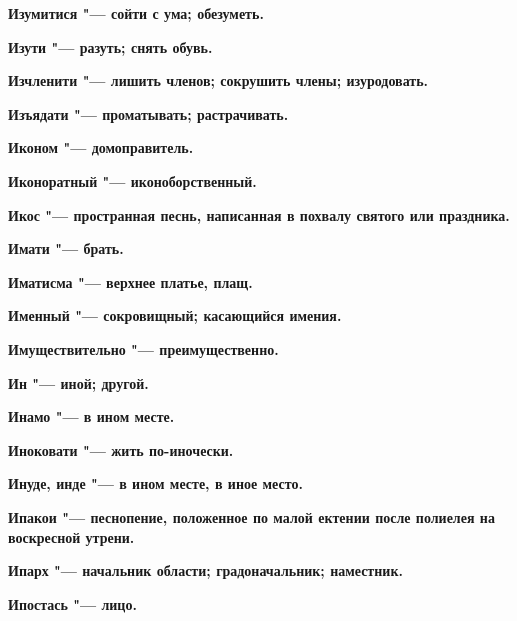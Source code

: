 \begin{mymulticols}{2}
\bfseries Изумитися\normalfont{} "--- сойти с ума; обезуметь. 




\bfseries Изути\normalfont{} "--- разуть; снять обувь. 




\bfseries Изчленити\normalfont{} "--- лишить членов; сокрушить члены; изуродовать. 




\bfseries Изъядати\normalfont{} "--- проматывать; растрачивать. 




\bfseries Иконом\normalfont{} "--- домоправитель. 




\bfseries Иконоратный\normalfont{} "--- иконоборственный. 




\bfseries Икос\normalfont{} "--- пространная песнь, написанная в похвалу святого или праздника. 




\bfseries Имати\normalfont{} "--- брать. 




\bfseries Иматисма\normalfont{} "--- верхнее платье, плащ. 




\bfseries Именный\normalfont{} "--- сокровищный; касающийся имения. 




\bfseries Имуществительно\normalfont{} "--- преимущественно. 




\bfseries Ин\normalfont{} "--- иной; другой. 




\bfseries Инамо\normalfont{} "--- в ином месте. 




\bfseries Иноковати\normalfont{} "--- жить по-иночески. 




\bfseries Инуде, инде\normalfont{} "--- в ином месте, в иное место. 




\bfseries Ипакои\normalfont{} "--- песнопение, положенное по малой ектении после полиелея на воскресной утрени. 




\bfseries Ипарх\normalfont{} "--- начальник области; градоначальник; наместник. 




\bfseries Ипостась\normalfont{} "--- лицо. 





\end{mymulticols}

